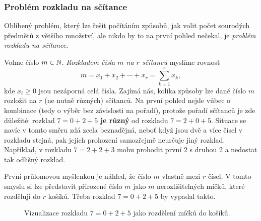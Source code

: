 \subsubsection{Problém rozkladu na sčítance}
\label{sssec:problem-rozkladu-na-scitance}

Oblíbený problém, který lze řešit počítáním způsobů, jak volit počet sourodých
předmětů z většího množství, ale nikdo by to na první pohled nečekal, je
\emph{problém rozkladu na sčítance}.

Volme číslo $m \in \mathbb{N}$. \emph{Rozkladem čísla $m$ na $r$ sčítanců} myslíme
rovnost
\[
 m = x_1 + x_2 + \cdots + x_r = \sum_{k=1}^{r} x_k,
\]
kde $x_i \geq 0$ jsou nezáporná celá čísla. Zajímá nás, kolika způsoby lze dané
číslo $m$ rozložit na $r$ (ne nutně různých) sčítanců. Na první pohled nejde
vůbec o kombinace (tedy o výběr bez závislosti na pořadí), protože pořadí
sčítanců je zde důležité: rozklad $7 = 0 + 2 + 5$ \textbf{je různý} od rozkladu
$7 = 2 + 0 + 5$. Situace se navíc v tomto směru zdá zcela beznadějná, neboť když
jsou dvě a více čísel v rozkladu stejná, pak jejich prohození samozřejmě
neurčuje jiný rozklad. Například, v rozkladu $7 = 2 + 2 + 3$ mohu prohodit první
$2$ s druhou $2$ a nedostat tak odlišný rozklad.

První průlomovou myšlenkou je náhled, že číslo $m$ vlastně  mezi
$r$ čísel. V tomto smyslu si lze představit přirozené číslo $m$ jako $m$
nerozlišitelných míčků, které rozděluji do $r$ košíků. Třeba rozklad $7 = 0 + 2
+ 5$ by vypadal takto.

\begin{figure}[h]
 \centering
 \label{fig:micky-do-kosiku}
 \caption{Vizualizace rozkladu $7 = 0 + 2 + 5$ jako rozdělení míčků do košíků.}
\end{figure}

